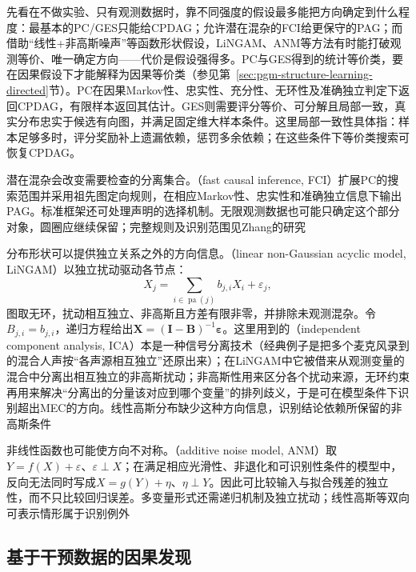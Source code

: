 先看在不做实验、只有观测数据时，靠不同强度的假设最多能把方向确定到什么程度：最基本的PC/GES只能给CPDAG；允许潜在混杂的FCI给更保守的PAG；而借助“线性+非高斯噪声”等函数形状假设，LiNGAM、ANM等方法有时能打破观测等价、唯一确定方向——代价是假设强得多。PC与GES得到的统计等价类，要在因果假设下才能解释为因果等价类（参见第~\ref{sec:pgm-structure-learning-directed}节）。PC在因果Markov性、忠实性、充分性、无环性及准确独立判定下返回CPDAG，有限样本返回其估计。GES则需要评分等价、可分解且局部一致，真实分布忠实于候选有向图，并满足固定维大样本条件。这里局部一致性具体指：样本足够多时，评分奖励补上遗漏依赖，惩罚多余依赖；在这些条件下等价类搜索可恢复CPDAG。

潜在混杂会改变需要检查的分离集合。（fast causal inference, FCI）扩展PC的搜索范围并采用祖先图定向规则，在相应Markov性、忠实性和准确独立信息下输出PAG。标准框架还可处理声明的选择机制。无限观测数据也可能只确定这个部分对象，圆圈应继续保留；完整规则及识别范围见Zhang的研究

分布形状可以提供独立关系之外的方向信息。（linear non-Gaussian acyclic model, LiNGAM）以独立扰动驱动各节点：
\[
  X_j=\sum_{i\in\operatorname{pa}(j)}b_{j,i}X_i+\varepsilon_j,
\]
图取无环，扰动相互独立、非高斯且方差有限非零，并排除未观测混杂。令$B_{j,i}=b_{j,i}$，递归方程给出$\bm{X}=(\bm{I}-\bm{B})^{-1}\bm{\varepsilon}$。这里用到的（independent component analysis, ICA）本是一种信号分离技术（经典例子是把多个麦克风录到的混合人声按“各声源相互独立”还原出来）；在LiNGAM中它被借来从观测变量的混合中分离出相互独立的非高斯扰动；非高斯性用来区分各个扰动来源，无环约束再用来解决“分离出的分量该对应到哪个变量”的排列歧义，于是可在模型条件下识别超出MEC的方向。线性高斯分布缺少这种方向信息，识别结论依赖所保留的非高斯条件

非线性函数也可能使方向不对称。（additive noise model, ANM）取$Y=f(X)+\varepsilon$、$\varepsilon\perp X$；在满足相应光滑性、非退化和可识别性条件的模型中，反向无法同时写成$X=g(Y)+\eta$、$\eta\perp Y$。因此可比较输入与拟合残差的独立性，而不只比较回归误差。多变量形式还需递归机制及独立扰动；线性高斯等双向可表示情形属于识别例外

\subsection{基于干预数据的因果发现}
\label{sec:pgm-structure-learning-interventional}

